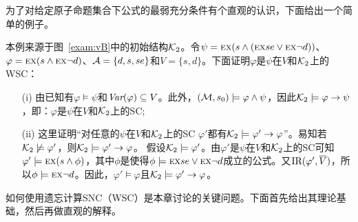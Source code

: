 为了对给定原子命题集合下公式的最弱充分条件有个直观的认识，下面给出一个简单的例子。

\begin{example}\label{examp:WSC}
	本例来源于图~\ref{exam:vB}中的初始结构${\cal K}_2$。令$\psi = \textsc{e} \textsc{x}(s \wedge (\textsc{e} \textsc{x} se \vee \textsc{e} \textsc{x} \neg d))$、$\varphi = \textsc{e} \textsc{x}(s \wedge \textsc{e} \textsc{x} \neg d)$、${\cal A} =\{d, s, se\}$和$V = \{s, d\}$。下面证明$\varphi$是$\psi$在$V$和${\cal K}_2$上的WSC：
	\begin{itemize}
		\item[(i)] 由已知有$\varphi \models \psi$和$\textit{Var}(\varphi) \subseteq V$。此外，$({\cal M}, s_0) \models \varphi \wedge \psi$，因此${\cal K}_2 \models \varphi \rightarrow \psi$，即：$\varphi$是$\psi$在$V$和${\cal K}_2$上的SC;
		\item[(ii)] 这里证明“对任意的$\psi$在$V$和${\cal K}_2$上的SC $\varphi'$都有${\cal K}_2 \models \varphi' \rightarrow \varphi$”。易知若${\cal K}_2 \not \models \varphi'$，则${\cal K}_2\models \varphi' \rightarrow \varphi$。
		假设${\cal K}_2 \models \varphi'$。由$\varphi'$是$\psi$在$V$和${\cal K}_2$上的SC可知$\varphi' \models \textsc{e} \textsc{x}(s \wedge \phi)$，其中$\phi$是使得$\phi\models \textsc{e} \textsc{x} se \vee \textsc{e} \textsc{x} \neg d$成立的公式。又$\textrm{IR}(\varphi', \overline V)$，所以$\phi \models \textsc{e} \textsc{x} \neg d$。因此，$\varphi' \models \varphi$且${\cal K}_2 \models \varphi' \rightarrow \varphi$。
	\end{itemize}
\end{example}


如何使用遗忘计算SNC（WSC）是本章讨论的关键问题。下面首先给出其理论基础，然后再做直观的解释。

